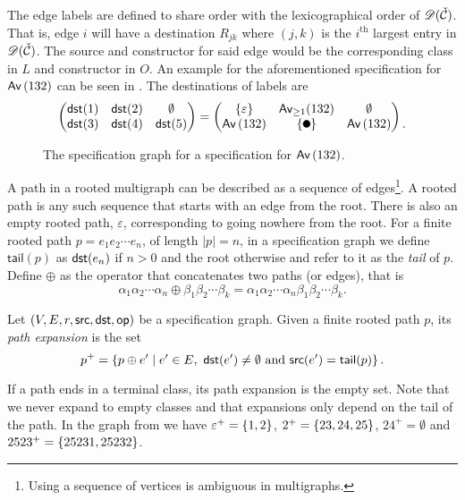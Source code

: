 The edge labels are defined to share order with the lexicographical order of $\mathscr{D}(\check{\mathcal{C}})$. That is, edge $i$ will have a destination $R_{jk}$  where $(j,k)$ is the $i^\text{th}$ largest entry in $\mathscr{D}(\check{\mathcal{C}})$. The source and constructor for said edge would be the corresponding class in $L$ and constructor in $O$. An example for the aforementioned specification for $\textsf{Av}\left(132\right)$ can be seen in . The destinations of labels are
\[
    \begin{pmatrix}
        \dst(1) & \dst(2) & \emptyset\\
        \dst(3) & \dst(4) & \dst(5)
    \end{pmatrix}
    =
    \begin{pmatrix}
    \set{\varepsilon} & \textsf{Av}_{\geq1}(132) & \emptyset \\
    \Av{132} & \set{\point{0.1}} & \Av{132}
    \end{pmatrix}
    \begin{matrix}\\.\end{matrix}
\]

\begin{figure}[ht!]
    \centering
    
    \caption{The specification graph for a specification for $\textsf{Av}\left(132\right)$.}
    \label{fig:specgraph132}
\end{figure}

A path in a rooted multigraph can be described as a sequence of edges\footnote{Using a sequence of vertices is ambiguous in multigraphs.}. A rooted path is any such sequence that starts with an edge from the root. There is also an empty rooted path, $\varepsilon$, corresponding to going nowhere from the root. For a finite rooted path $p=e_1e_2\dotsm e_n$, of length $|p|=n$, in a specification graph we define $\textsf{tail}(p)$ as $\textsf{dst}(e_n)$ if $n>0$ and the root otherwise and refer to it as the \emph{tail} of $p$. Define $\oplus$ as the operator that concatenates two paths (or edges), that is
\[
    \alpha_1\alpha_2 \dotsm \alpha_n \oplus \beta_1\beta_2 \dotsm \beta_k = \alpha_1\alpha_2 \dotsm \alpha_n\beta_1\beta_2 \dotsm \beta_k.
\]

\begin{definition}
Let $(V,E,r,\textsf{src},\textsf{dst},\textsf{op})$ be a specification graph. Given a finite rooted path $p$, its \emph{path expansion} is the set 
\[
    p^+ = \left\{p \oplus e' \mid e' \in E, \ \textsf{dst}(e') \neq \emptyset \text{ and } \textsf{src}(e') = \textsf{tail}(p)\right\}.
\]
\end{definition}
If a path ends in a terminal class, its path expansion is the empty set. Note that we never expand to empty classes and that expansions only depend on the tail of the path. In the graph from  we have $\varepsilon^+ = \left\{1,2\right\}$, $2^+ = \left\{23,24,25\right\}$, $24^+ = \emptyset$ and $2523^+ = \left\{25231, 25232\right\}$.


